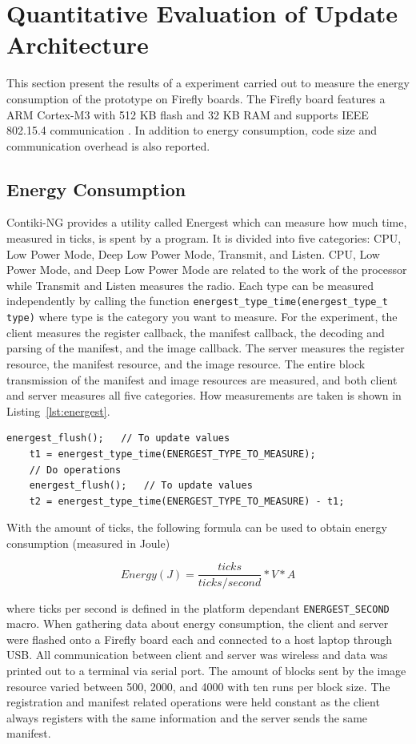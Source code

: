 \documentclass[0-thesis.tex]{subfiles}
\begin{document}
\section{Quantitative Evaluation of Update Architecture}
\label{sec:quant-evaluation}
This section present the results of a experiment carried out to measure the energy
consumption of the prototype on Firefly boards. The Firefly board features a ARM Cortex-M3
with 512 KB flash and 32 KB RAM and supports IEEE 802.15.4 communication
\parencite{firefly-datasheet}. In addition to energy consumption, code size and
communication overhead is also reported. 

\subsection{Energy Consumption}
\label{ssec:energy-consumption}
Contiki-NG provides a utility called Energest which can measure how much time, measured in
ticks, is spent by a program. It is divided into five categories: CPU, Low Power Mode,
Deep Low Power Mode, Transmit, and Listen. CPU, Low Power Mode, and Deep Low Power Mode
are related to the work of the processor while Transmit and Listen measures the radio.
Each type can be measured independently by calling the function
\texttt{energest\_type\_time(energest\_type\_t type)} where type is the category you want
to measure. For the experiment, the client measures the register callback, the manifest
callback, the decoding and parsing of the manifest, and the image callback. The server
measures the register resource, the manifest resource, and the image resource. The entire
block transmission of the manifest and image resources are measured, and both client and
server measures all five categories. How measurements are taken is shown in
Listing~\ref{lst:energest}.

\begin{lstlisting}[language=manifest, caption={How to measure ticks in energest.}, label=lst:energest]
    energest_flush();   // To update values
    t1 = energest_type_time(ENERGEST_TYPE_TO_MEASURE);
    // Do operations
    energest_flush();   // To update values
    t2 = energest_type_time(ENERGEST_TYPE_TO_MEASURE) - t1;
\end{lstlisting}

With the amount of ticks, the following formula can be used to obtain energy consumption
(measured in Joule)

$$ Energy (J) = \frac{ticks}{ticks/second} * V * A $$

where ticks per second is defined in the platform dependant \texttt{ENERGEST\_SECOND}
macro. When gathering data about energy consumption, the client and server were flashed
onto a Firefly board each and connected to a host laptop through USB. All communication
between client and server was wireless and data was printed out to a terminal via serial
port. The amount of blocks sent by the image resource varied between 500, 2000, and 4000
with ten runs per block size. The registration and manifest related operations were held
constant as the client always registers with the same information and the server sends the
same manifest. 
\end{document}
